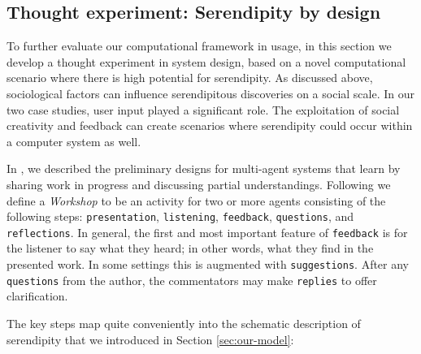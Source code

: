 \subsection{Thought experiment:  Serendipity by design} \label{sec:ww}

To further evaluate our computational framework in usage, in this
section we develop a thought experiment in system design, based on a
novel computational scenario where there is high potential for
serendipity.  As discussed above, sociological factors can influence
serendipitous discoveries on a social scale.  In our two case studies,
user input played a significant role.  The exploitation of social
creativity and feedback can create scenarios where serendipity could
occur within a computer system as well.

In \cite{poetry-workshop}, we described the preliminary designs for
multi-agent systems that learn by sharing work in progress and
discussing partial understandings.  
%
Following 
we define a \emph{Workshop} to be an activity for two or more agents
consisting of the following steps:
{\tt presentation}, {\tt listening}, {\tt feedback}, {\tt questions},
and {\tt reflections}.  In general, the first and most important
feature of {\tt feedback} is for the listener to say what they heard;
in other words, what they find in the presented work.  In some
settings this is augmented with {\tt suggestions}.  After any {\tt
  questions} from the author, the commentators may make {\tt replies}
to offer clarification.

The key steps map quite conveniently into the schematic description of serendipity that we introduced in Section \ref{sec:our-model}:


